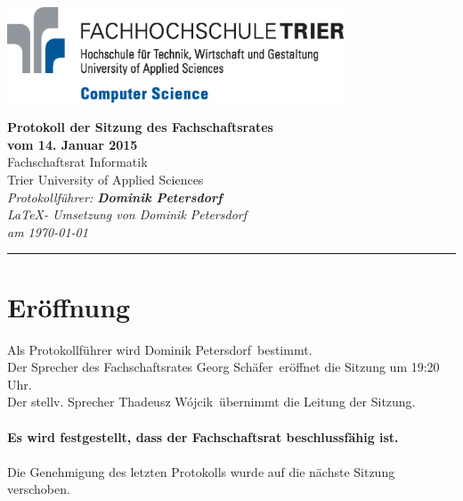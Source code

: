 \documentclass[a4paper, 11pt]{article} %
\newcommand{\protokoller}{Dominik Petersdorf}
\newcommand{\dateOfMeeting}{14. Januar 2015}
\newcommand{\TeXer}{Dominik Petersdorf}
\newcommand{\fsiPresident}{Georg Schäfer}
\newcommand{\fsiLeitung}{Thadeusz W{\'o}jcik}
\begin{document}

\doublespacing
\thispagestyle{empty}

\begin{center}
\includegraphics[width=10.0cm]{../logo_faculty_computer_science.eps}

\vspace*{\fill}
{\LARGE \textbf{Protokoll der Sitzung des Fachschaftsrates \\vom \dateOfMeeting}}\\
Fachschaftsrat Informatik\\
Trier University of Applied Sciences\\
\vspace{2.5cm}
\textit{
	Protokollführer: \textbf{\protokoller} \\
	\LaTeX - Umsetzung von \TeXer\\
	am \today
}
\vfill
\end{center}

\hspace*{-35cm}
\textcolor{fsi}{\rule{64.9cm}{15pt}}
\pagebreak
 
\setcounter{tocdepth}{2}
\tableofcontents 
\pagebreak

\section{Eröffnung}
Als Protokollführer wird \protokoller~bestimmt.\\
Der Sprecher des Fachschaftsrates \fsiPresident~eröffnet die Sitzung um 19:20 Uhr.
\\
Der stellv. Sprecher \fsiLeitung~übernimmt die Leitung der Sitzung.
\\\\
\textbf{Es wird festgestellt, dass der Fachschaftsrat beschlussfähig ist.}
\\\\
Die Genehmigung des letzten Protokolls wurde auf die nächste Sitzung verschoben.
\end{document}

